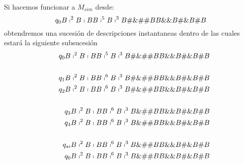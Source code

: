 \begin{frame}
  \PN Si hacemos funcionar a $M_{sim}$ desde:
  \[
    q_{0} B \shortmid^{2} B \shortmid BB \shortmid^{5} B \shortmid^{3} B \#\&\#\# BB \&\& B \#\& B \# B
  \]
  \PN obtendremos una sucesión de descripciones instantaneas dentro de las cuales estará la siguiente subsucesión
  \begin{eqnarray*}
    && q_{0} B \shortmid^{2} B \shortmid BB \shortmid^{5} B \shortmid^{3} B \#\&\#\# BB \&\& B \#\& B \# B \\
    && \\
    && q_{1} B \shortmid^{2} B \shortmid BB \shortmid^{6} B \shortmid^{3} B \#\&\#\# BB \&\& B \#\& B \# B \\
    && q_{2} B \shortmid^{2} B \shortmid BB \shortmid^{6} B \shortmid^{3} B \#\&\#\# BB \&\& B \#\& B \# B \\
    && \\
    && q_{3} B \shortmid^{2} B \shortmid BB \shortmid^{6} B \shortmid^{3} B \&\#\# BB \&\& B \#\& B \# B \\
    && q_{4} B \shortmid^{2} B \shortmid BB \shortmid^{6} B \shortmid^{3} B \&\#\# BB \&\& B \#\& B \# B \\
    && \\
    && q_{si} B \shortmid^{2} B \shortmid BB \shortmid^{6} B \shortmid^{3} B \&\#\# BB \&\& B \#\& B \# B \\
    && q_{0} B \shortmid^{2} B \shortmid BB \shortmid^{6} B \shortmid^{3} B \&\#\# BB \&\& B \#\& B \# B \\
  \end{eqnarray*}
\end{frame}
